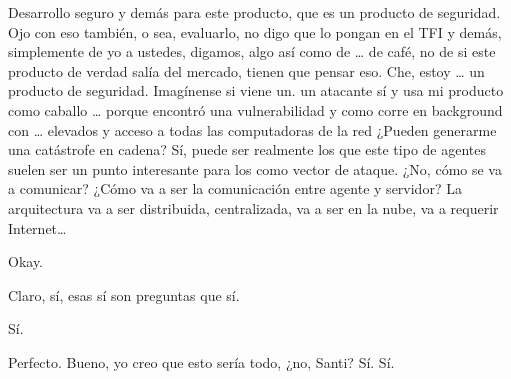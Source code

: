 \begin{description}[leftmargin=0cm, labelsep=0.5cm]
    \item[\textbf{PEÑA ALEJANDRO FRANCISCO:}] Desarrollo seguro y demás para este producto, que es un producto de seguridad. Ojo con eso también, o sea, evaluarlo, no digo que lo pongan en el TFI y demás, simplemente de yo a ustedes, digamos, algo así como de … de café, no de si este producto de verdad salía del mercado, tienen que pensar eso. Che, estoy … un producto de seguridad. Imagínense si viene un. un atacante sí y usa mi producto como caballo … porque encontró una vulnerabilidad y como corre en background con … elevados y acceso a todas las computadoras de la red ¿Pueden generarme una catástrofe en cadena? Sí, puede ser realmente los que este tipo de agentes suelen ser un punto interesante para los como vector de ataque. ¿No, cómo se va a comunicar? ¿Cómo va a ser la comunicación entre agente y servidor? La arquitectura va a ser distribuida, centralizada, va a ser en la nube, va a requerir Internet…

    \item[\textbf{MOCIULSKY SANTIAGO:}] Okay.

    \item[\textbf{MUNTAABSKI FEDERICO:}] Claro, sí, esas sí son preguntas que sí.

    \item[\textbf{MOCIULSKY SANTIAGO:}] Sí.

    \item[\textbf{MUNTAABSKI FEDERICO:}] Perfecto. Bueno, yo creo que esto sería todo, ¿no, Santi? Sí. Sí.
\end{description}
